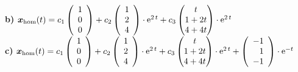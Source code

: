 { \textbf{b)}
$	\boldsymbol x_{\mathrm{hom}} (t) = c_1\left(\begin{array}{c} 1 \\ 0 \\ 0 \end{array}\right) + c_2\left(\begin{array}{c} 1 \\ 2 \\ 4 \end{array}\right)\cdot\mathrm{e}^{2\,t} + c_3\begin{pmatrix} t\\ 1+2t \\ 4+4t \end{pmatrix}\cdot\mathrm{e}^{2\,t}$\\
\textbf{c)}
$	\boldsymbol x_{\mathrm{hom}} (t) = c_1\left(\begin{array}{c} 1 \\ 0 \\ 0 \end{array}\right) + c_2\left(\begin{array}{c} 1 \\ 2 \\ 4 \end{array}\right)\cdot\mathrm{e}^{2\,t} + c_3\begin{pmatrix} t\\ 1+2t \\ 4+4t \end{pmatrix}\cdot\mathrm{e}^{2\,t} + 	\left(\begin{array}{r} -1 \\ 1 \\ -1 \end{array}\right)\cdot\mathrm{e}^{-t}$
}

